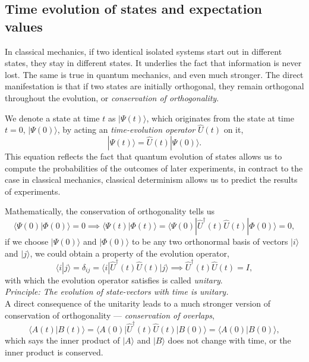 \documentclass{article}
\newcommand{\be}{\begin{equation}}
\newcommand{\ee}{\end{equation}}
\newcommand{\1}{\left}
\newcommand{\2}{\right}
\newcommand{\br}{\langle}
\newcommand{\ke}{\rangle}
\begin{document}
\subsection{Time evolution of states and expectation values}

In classical mechanics, if two identical isolated systems start out in different states, they stay in different states. It underlies the fact that information is never lost. The same is true in quantum mechanics, and even much stronger. The direct manifestation is that if two states are initially orthogonal, they remain orthogonal throughout the evolution, or \textit{conservation of orthogonality}.

We denote a state at time $t$ as $|\Psi(t)\ke$, which originates from the state at time $t=0$, $|\Psi(0)\ke$, by acting an \textit{time-evolution operator} $\hat U(t)$ on it,
\be
|\Psi(t)\ke=\hat U(t) |\Psi(0)\ke.
\ee
This equation reflects the fact that quantum evolution of states allows us to compute the probabilities of the outcomes of later experiments, in contract to the case in classical mechanics, classical determinism allows us to predict the results of experiments. 

Mathematically, the conservation of orthogonality tells us
\be
\br \Psi(0)|\Phi(0)\ke=0 \implies \br \Psi(t)|\Phi(t)\ke=\br \Psi(0)|\hat U^\dagger(t) \hat U(t)|\Phi(0)\ke=0,
\ee
if we choose $|\Psi(0)\ke$ and $|\Phi(0)\ke$ to be any two orthonormal basis of vectors $|i\ke$ and $|j\ke$, we could obtain a property of the evolution operator,
\be
\br i|j\ke =\delta_{ij} = \br i|\hat U^\dagger(t) \hat U(t)|j\ke \implies \hat U^\dagger(t) \hat U(t)=I,
\ee
with which the evolution operator satisfies is called \textit{unitary}.\\

\textit{Principle: The evolution of state-vectors with time is unitary.}\\

A direct consequence of the unitarity leads to a much stronger version of conservation of orthogonality --- \textit{conservation of overlaps},
\be
\br A(t)|B(t)\ke = \br A(0) |\hat U^\dagger(t)\hat U(t)|B(0)\ke = \br A(0)|B(0)\ke,
\ee
which says the inner product of $|A\ke$ and $|B\ke$ does not change with time, or the inner product is conserved.\\
\end{document}

